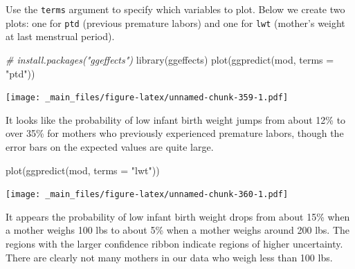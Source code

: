 \documentclass[
]{book}
\newenvironment{Shaded}{\begin{snugshade}}{\end{snugshade}}
\newcommand{\AttributeTok}[1]{\textcolor[rgb]{0.77,0.63,0.00}{#1}}
\newcommand{\CommentTok}[1]{\textcolor[rgb]{0.56,0.35,0.01}{\textit{#1}}}
\newcommand{\FunctionTok}[1]{\textcolor[rgb]{0.00,0.00,0.00}{#1}}
\newcommand{\NormalTok}[1]{#1}
\newcommand{\StringTok}[1]{\textcolor[rgb]{0.31,0.60,0.02}{#1}}
\begin{document}
Use the \texttt{terms} argument to specify which variables to plot. Below we create two plots: one for \texttt{ptd} (previous premature labors) and one for \texttt{lwt} (mother's weight at last menstrual period).

\begin{Shaded}
\begin{Highlighting}[]
\CommentTok{\# install.packages("ggeffects")}
\FunctionTok{library}\NormalTok{(ggeffects)}
\FunctionTok{plot}\NormalTok{(}\FunctionTok{ggpredict}\NormalTok{(mod, }\AttributeTok{terms =} \StringTok{"ptd"}\NormalTok{))}
\end{Highlighting}
\end{Shaded}

\texttt{[image: \_main\_files/figure-latex/unnamed-chunk-359-1.pdf]}

It looks like the probability of low infant birth weight jumps from about 12\% to over 35\% for mothers who previously experienced premature labors, though the error bars on the expected values are quite large.

\begin{Shaded}
\begin{Highlighting}[]
\FunctionTok{plot}\NormalTok{(}\FunctionTok{ggpredict}\NormalTok{(mod, }\AttributeTok{terms =} \StringTok{"lwt"}\NormalTok{))}
\end{Highlighting}
\end{Shaded}

\texttt{[image: \_main\_files/figure-latex/unnamed-chunk-360-1.pdf]}

It appears the probability of low infant birth weight drops from about 15\% when a mother weighs 100 lbs to about 5\% when a mother weighs around 200 lbs. The regions with the larger confidence ribbon indicate regions of higher uncertainty. There are clearly not many mothers in our data who weigh less than 100 lbs.

  
\end{document}
